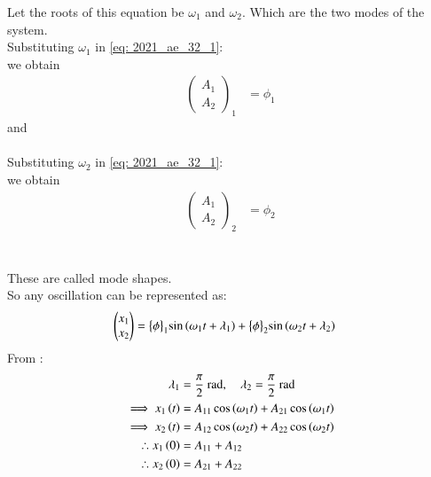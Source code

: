 \documentclass[journal,12pt,twocolumn]{IEEEtran}
\theoremstyle{remark}
\begin{document}
Let the roots of this equation be $ \omega_1$ and $ \omega_2$. Which are the two modes of the system.\\
Substituting $ \omega_1$ in \eqref{eq: 2021_ae_32_1}:\\
we obtain 
\begin{align}
\begin{pmatrix}
A_1\\
A_2
\end{pmatrix}_1 &= \phi_1
\end{align}
and \\\\
Substituting $ \omega_2$ in \eqref{eq: 2021_ae_32_1}:\\
we obtain 
\begin{align}
\begin{pmatrix}
A_1\\
A_2
\end{pmatrix}_2 &= \phi_2
\end{align}
\\\\
These are called mode shapes.\\
So any oscillation can be represented as:
\begin{align}
\begin{pmatrix}
x_1\\
x_2
\end{pmatrix}
&= \bigl\{ \phi \bigl\}_1\sin{\ensuremath{\left(\omega_1 t+\lambda_1\right)}} +\bigl\{ \phi \bigl\}_2\sin{\ensuremath{\left(\omega_2 t+\lambda_2\right)}}
\end{align}
From :
\begin{align}
\lambda_1 &= \frac{\pi}{2}\text{ rad}, \quad \lambda_2=\frac{\pi}{2}\text{ rad}\\
\implies x_1\left(t\right)&= A_{11}\cos{\ensuremath{\left(\omega_1 t\right)}} + A_{21}\cos{\ensuremath{\left(\omega_1 t\right)}}\\
\implies x_2\left(t\right)&= A_{12}\cos{\ensuremath{\left(\omega_2 t\right)}} + A_{22}\cos{\ensuremath{\left(\omega_2 t\right)}}\\
\therefore x_1\left(0\right) &= A_{11} + A_{12}\\
\therefore x_2\left(0\right) &= A_{21} + A_{22}
\end{align}
\end{document}
